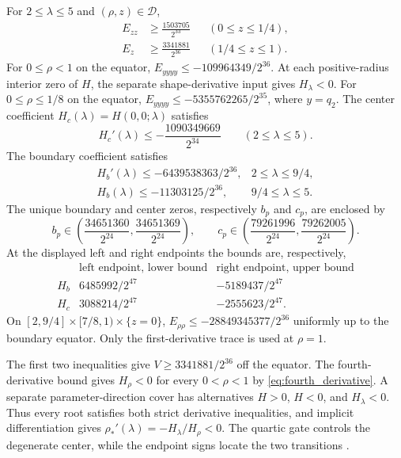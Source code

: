 \begin{computationalassertion}
\label{comp:c4}
For $2\leq\lambda\leq5$ and $(\rho,z)\in\mathcal D$,
\begin{align*}
 E_{zz}&\geq\frac{1503705}{2^{33}}
          &&(0\leq z\leq1/4),\\
 E_z&\geq\frac{3341881}{2^{36}}
          &&(1/4\leq z\leq1).
\end{align*}
For $0\leq\rho<1$ on the equator, $E_{yyyy}\leq-109964349/2^{36}$. At each positive-radius interior zero of $H$, the separate shape-derivative input gives $H_\lambda<0$.
For $0\leq\rho\leq1/8$ on the equator,
$E_{yyyy}\leq-5355762265/2^{35}$, where $y=q_2$.
The center coefficient $H_c(\lambda)=H(0,0;\lambda)$ satisfies
\[
 H_c'(\lambda)\leq-\frac{1090349669}{2^{34}}
 \qquad(2\leq\lambda\leq5).
\]
The boundary coefficient satisfies
\[
 \begin{array}{ll}
 H_b'(\lambda)\leq-6439538363/2^{36},&2\leq\lambda\leq9/4,\\
 H_b(\lambda)\leq-11303125/2^{36},&9/4\leq\lambda\leq5.
 \end{array}
\]
The unique boundary and center zeros, respectively $b_p$ and $c_p$,
are enclosed by
\[
 b_p\in\left(\frac{34651360}{2^{24}},\frac{34651369}{2^{24}}\right),
 \qquad
 c_p\in\left(\frac{79261996}{2^{24}},\frac{79262005}{2^{24}}\right).
\]
At the displayed left and right endpoints the bounds are, respectively,
\[
 \begin{array}{c|cc}
 &\text{left endpoint, lower bound}&\text{right endpoint, upper bound}\\ \hline
 H_b&6485992/2^{47}&-5189437/2^{47}\\
 H_c&3088214/2^{47}&-2555623/2^{47}.
 \end{array}
\]
On $[2,9/4]\times[7/8,1)\times\{z=0\}$,
$E_{\rho\rho}\leq-28849345377/2^{36}$ uniformly up to the
boundary equator.  Only the first-derivative trace is used at
$\rho=1$.
\end{computationalassertion}

The first two inequalities give $V\geq3341881/2^{36}$ off the
equator.  The fourth-derivative bound gives $H_\rho<0$ for every $0<\rho<1$ by \eqref{eq:fourth_derivative}.
A separate parameter-direction cover has alternatives $H>0$,
$H<0$, and $H_\lambda<0$.
Thus every root satisfies both strict derivative inequalities,
and implicit differentiation gives
$\rho_*'(\lambda)=-H_\lambda/H_\rho<0$.
The quartic gate controls the degenerate center, while the endpoint
signs locate the two transitions \citep{data-window}.


